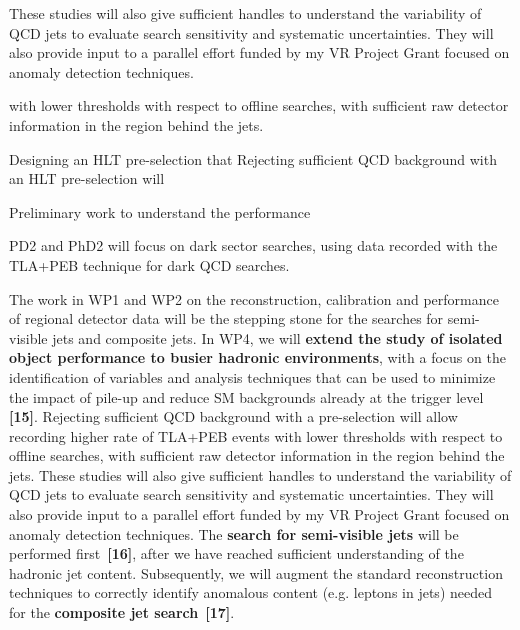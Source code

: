 \clearpage
\begingroup

    \linespread{0.9}\selectfont

\endgroup
  

These studies will also give sufficient handles to understand the variability of QCD jets to evaluate search sensitivity and systematic uncertainties.
They will also provide input to a parallel effort funded by my VR Project Grant focused on anomaly detection techniques.  




 with lower thresholds with respect to offline searches, with sufficient raw detector information in the region behind the jets. 
 


Designing an HLT pre-selection that 
Rejecting sufficient QCD background with an HLT pre-selection will 

Preliminary work to understand the performance 





PD2 and PhD2 will focus on dark sector searches, using data recorded with the TLA+PEB technique for dark QCD searches. 

The work in WP1 and WP2 on the reconstruction, calibration and performance of regional detector data will be the stepping stone for the searches for semi-visible jets and composite jets. 
In WP4, we will \textbf{extend the study of isolated object performance to busier hadronic environments}, with a focus on the identification of variables and analysis techniques that can be used to minimize the impact of pile-up and reduce SM backgrounds already at the trigger level \textbf{[15]}. 
Rejecting sufficient QCD background with a pre-selection will allow recording higher rate of TLA+PEB events with lower thresholds with respect to offline searches, with sufficient raw detector information in the region behind the jets. 
These studies will also give sufficient handles to understand the variability of QCD jets to evaluate search sensitivity and systematic uncertainties.
They will also provide input to a parallel effort funded by my VR Project Grant focused on anomaly detection techniques.  
The \textbf{search for semi-visible jets} will be performed first~\textbf{[16]}, after we have reached sufficient understanding of the hadronic jet content. 
Subsequently, we will augment the standard reconstruction techniques to correctly identify anomalous content (e.g. leptons in jets) needed for the \textbf{composite jet search}~\textbf{[17]}.

